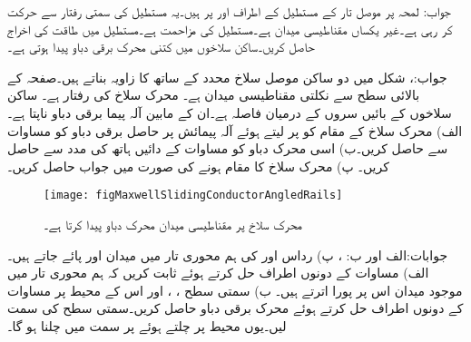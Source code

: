 جواب:
لمحہ  پر موصل تار کے مستطیل کے اطراف  اور  پر ہیں۔یہ مستطیل  کی سمتی رفتار سے حرکت کر رہی ہے۔غیر یکساں مقناطیسی میدان  ہے۔مستطیل کی مزاحمت  ہے۔مستطیل میں طاقت کی اخراج حاصل کریں۔ساکن سلاخوں میں کتنی محرک برقی دباو پیدا ہوتی ہے۔  

جواب:، 
شکل  میں دو ساکن موصل سلاخ  محدد کے ساتھ  کا زاویہ بناتے ہیں۔صفحہ کے بالائی سطح سے نکلتی مقناطیسی میدان  ہے۔ محرک سلاخ کی رفتار  ہے۔ ساکن سلاخوں کے بائیں سروں کے درمیان فاصلہ  ہے۔ان کے مابین  آلہ پیما برقی دباو  ناپتا ہے۔ الف) محرک سلاخ کے مقام کو  پر  لیتے ہوئے آلہ پیمائش پر حاصل برقی دباو کو مساوات  سے حاصل کریں۔ب)  اسی محرک دباو کو مساوات  کے دائیں ہاتھ کی مدد سے حاصل کریں۔ پ) محرک سلاخ کا مقام  ہونے کی صورت میں جواب حاصل کریں۔
\begin{figure}
\centering
\texttt{[image: figMaxwellSlidingConductorAngledRails]}
\caption{محرک سلاخ پر مقناطیسی میدان محرک دباو پیدا کرتا ہے۔}
\label{شکل_میکس_ویل_سوال_محرک_سلاخ_ترچھی_ریل}
\end{figure}

جوابات:الف اور ب: ، پ)  
رداس  اور  کی ہم محوری تار میں میدان  اور  پائے جاتے ہیں۔ الف) مساوات  کے دونوں اطراف حل کرتے ہوئے ثابت کریں کہ ہم محوری تار میں موجود میدان اس پر پورا اترتے ہیں۔ ب) سمتی سطح ، ،  اور اس کے محیط پر مساوات  کے دونوں اطراف حل کرتے ہوئے محرک برقی دباو حاصل کریں۔سمتی سطح کی سمت  لیں۔یوں محیط پر چلتے ہوئے  پر  سمت میں چلنا ہو گا۔    

